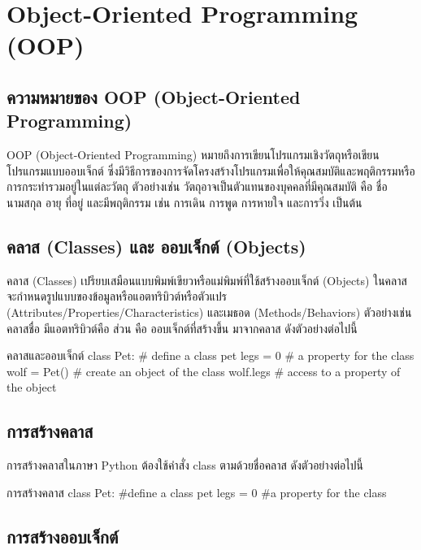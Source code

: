 \chapter{Object-Oriented Programming (OOP)}
\section{ความหมายของ OOP (Object-Oriented Programming)}

OOP (Object-Oriented Programming) หมายถึงการเขียนโปรแกรมเชิงวัตถุหรือเขียนโปรแกรมแบบออบเจ็กต์ ซึ่งมีวิธีการของการจัดโครงสร้างโปรแกรมเพื่อให้คุณสมบัติและพฤติกรรมหรือการกระทำรวมอยู่ในแต่ละวัตถุ \cite{Mar11} ตัวอย่างเช่น วัตถุอาจเป็นตัวแทนของบุคคลที่มีคุณสมบัติ คือ ชื่อ นามสกุล อายุ ที่อยู่ และมีพฤติกรรม เช่น การเดิน การพูด การหายใจ และการวิ่ง เป็นต้น

\section{คลาส (Classes) และ ออบเจ็กต์ (Objects)}

คลาส (Classes) เปรียบเสมือนแบบพิมพ์เขียวหรือแม่พิมพ์ที่ใช้สร้างออบเจ็กต์ (Objects) ในคลาสจะกำหนดรูปแบบของข้อมูลหรือแอตทริบิวต์หรือตัวแปร (Attributes/Properties/Characteristics) และเมธอด (Methods/Behaviors) ตัวอย่างเช่น คลาสชื่อ  มีแอตทริบิวต์คือ  ส่วน  คือ ออบเจ็กต์ที่สร้างขึ้น มาจากคลาส  ดังตัวอย่างต่อไปนี้

\begin{codelist}{คลาสและออบเจ็กต์}{}
class Pet: # define a class pet
    legs = 0  # a property for the class
    wolf = Pet() # create an object of the class 
    wolf.legs # access to a property of the object
\end{codelist}

\section{การสร้างคลาส}

การสร้างคลาสในภาษา Python ต้องใช้คำสั่ง class ตามด้วยชื่อคลาส ดังตัวอย่างต่อไปนี้

\begin{codelist}{การสร้างคลาส}{}
class Pet: #define a class pet
    legs = 0 #a property for the class
\end{codelist}


\section{การสร้างออบเจ็กต์}

